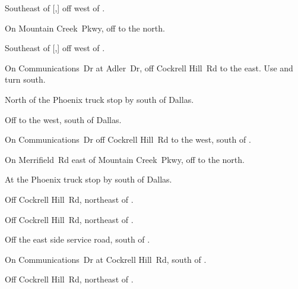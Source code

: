 
\begin{LocationList}

Southeast of [,] off  west of  .

On Mountain Creek~Pkwy, off   to the north.

Southeast of [,] off  west of  .

On Communications~Dr at Adler~Dr, off Cockrell Hill~Rd to the east.
Use   and turn south.

\Location{\GarageHQ \Garage}
North of the Phoenix truck stop by   south of Dallas.

Off   to the west, south of Dallas.

On Communications~Dr off Cockrell Hill~Rd to the west, south of  .

On Merrifield~Rd east of Mountain Creek~Pkwy, off   to the north.

At the Phoenix truck stop by   south of Dallas.

Off Cockrell Hill~Rd, northeast of  .

\Location{\RecruitmentAgency \Recruitment}
Off Cockrell Hill~Rd, northeast of  .

Off the east side  service road, south of .

On Communications~Dr at Cockrell Hill~Rd, south of  .

Off Cockrell Hill~Rd, northeast of  .

\end{LocationList}
